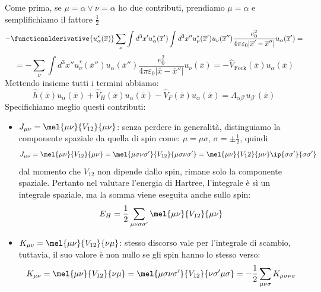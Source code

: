 Come prima, se $\mu=\alpha \vee \nu=\alpha$ ho due contributi, prendiamo $\mu=\alpha$ e semplifichiamo il fattore $\frac 12$
\begin{equation*}
    - \functionalderivative{u_\alpha^*(\overline x)} \sum_{\nu}\int d^3x' u_{\alpha}^*(\overline{x}')\int d^3x''u_\nu^*(\overline{x}')u_\nu(\overline{x}'')\frac{e_0^2}{4\pi\varepsilon_0|\overline{x}'-\overline{x}''|}u_\alpha(\overline{x}') =
\end{equation*}
\begin{equation*}
    = -\sum_\nu \int d^3x''u_\nu^*(\overline{x}'')u_\alpha(\overline{x}'')\frac{e_0^2}{4\pi\varepsilon_0|\overline{x}-\overline{x}''|}u_\nu(\overline{x})=-\hat V_{\text{Fock}}(\overline x)u_\alpha(\overline x)
\end{equation*}
Mettendo insieme tutti i termini abbiamo:
\begin{equation*}
    \hat h(\overline x) u_\alpha(\overline x)+\hat V_H(\overline x)u_\alpha(\overline x)-\hat V_F(\overline x) u_\alpha(\overline x) = \Lambda_{\alpha\beta'}u_{\beta'}(\overline x)
\end{equation*}
Specifichiamo meglio questi contributi:
\begin{itemize}
    \item $J_{\mu\nu}=\mel{\mu\nu}{V_{12}}{\mu\nu}$: senza perdere in generalità, distinguiamo la componente spaziale da quella di spin come: $\mu=\mu\sigma$, $\sigma=\pm\frac 12$, quindi
    \begin{equation*}
        J_{\mu\nu}=\mel{\mu\nu}{V_{12}}{\mu\nu}=\mel{\mu\sigma\nu\sigma'}{V_{12}}{\mu\sigma\nu\sigma'}=\mel{\mu\nu}{V_12}{\mu\nu}\ip{\sigma\sigma'}{\sigma\sigma'}
    \end{equation*}
    dal momento che $V_{12}$ non dipende dallo spin, rimane solo la componente spaziale. Pertanto nel valutare l'energia di Hartree, l'integrale è sì un integrale spaziale, ma la somma viene eseguita anche sullo spin:
    \begin{equation*}
        E_H=\frac 12\sum_{\mu\nu\sigma\sigma'}\mel{\mu\nu}{V_{12}}{\mu\nu}
    \end{equation*}
    \item $K_{\mu\nu}=\mel{\mu\nu}{V_{12}}{\nu\mu}$: stesso discorso vale per l'integrale di scambio, tuttavia, il suo valore è non nullo se gli spin hanno lo stesso verso:
    \begin{equation*}
        K_{\mu\nu}=\mel{\mu\nu}{V_{12}}{\nu\mu}=\mel{\mu\sigma\nu\sigma'}{V_{12}}{\nu\sigma'\mu\sigma}=-\frac 12 \sum_{\mu\nu\sigma}K_{\mu\sigma\nu\sigma}
    \end{equation*}
\end{itemize}

